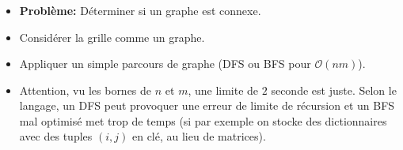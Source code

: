 \begin{frame}
    \frametitle{\problemtitle}
    \begin{itemize}
        \item<+-> \textbf{Problème:} Déterminer si un graphe est connexe.
        \item<+-> Considérer la grille comme un graphe.
        \item<+-> Appliquer un simple parcours de graphe (DFS ou BFS pour $\mathcal O(nm)$).
        \item<+-> Attention, vu les bornes de $n$ et $m$, une limite de $2$ seconde est juste. Selon le langage, un DFS peut provoquer une erreur de limite de récursion et un BFS mal optimisé met trop de temps (si par exemple on stocke des dictionnaires avec des tuples $(i,j)$ en clé, au lieu de matrices).
    \end{itemize}
    \solvestats
\end{frame}
